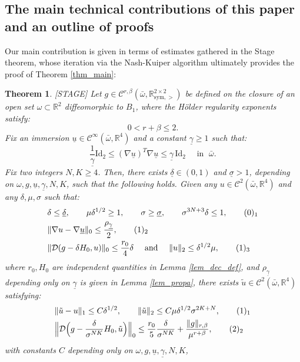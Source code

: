 \documentclass[reqno,twoside,11pt]{amsart}
\newcommand{\sym}{\mathrm{sym}}
\newcommand{\Id}{\mathrm{Id}}
\newcommand{\R}{\mathbb{R}}
\numberwithin{equation}{section}
\theoremstyle{plain}
\newtheorem{theorem}{Theorem}[section]
\theoremstyle{definition}
\begin{document}
\medskip

\subsection{The main technical contributions of this paper and an outline of proofs}
\label{stage_sketch}

Our main contribution is given in terms of estimates
gathered in the Stage theorem, whose iteration via
the Nash-Kuiper algorithm ultimately provides the proof of Theorem \ref{thm_main}: 

\begin{theorem}\label{thm_STA} {\textup{[STAGE]}}
Let $g\in \mathcal{C}^{r,\beta}(\bar\omega, \R^{2\times 2}_{\sym,>})$  be
defined on the closure of an open set $\omega\subset\R^2$
diffeomorphic to $B_1$, where the H\"older regularity exponents satisfy:
\begin{equation}\label{regu}
0<r+\beta\leq 2.
\end{equation}
Fix an immersion $\underline u\in\mathcal{C}^\infty(\bar\omega,\R^4)$
and a constant $\underline\gamma\ge 1$ such that:
\begin{equation}\label{imma}
\frac{1}{\underline\gamma}\Id_2\leq (\nabla \underline u)^T\nabla \underline u\leq
\underline\gamma\,\Id_2\quad\mbox{ in } \;\bar\omega.
\end{equation}
Fix two integers $N,K\geq 4$. Then, there exists
$\underline \delta\in (0,1)$ and $\underline\sigma>1$, depending 
on $\omega, g, \underline u,\underline \gamma, N, K$, such that the following holds.
Given any $u\in\mathcal{C}^2(\bar\omega,\R^4)$ and any $\delta, \mu, \sigma$ such that:
\begin{align*}
& \delta\leq \underline\delta,\qquad \mu\delta^{1/2}\geq 1,
\qquad\sigma\geq \underline\sigma,\qquad \sigma^{3N+3}\delta\leq 1,
\tag*{(\theequation)$_1$}\refstepcounter{equation} \label{Ass1} \\
& \|\nabla u-\nabla \underline u\|_0\leq \frac{\rho_{\underline\gamma}}{2},
\tag*{(\theequation)$_2$} \label{Ass2}\\
& \|\mathcal{D}(g-\delta H_0, u)\|_0\leq\frac{r_0}{4}\delta \quad\mbox{
and }\quad \|u\|_2\leq \delta^{1/2}\mu,
\tag*{(\theequation)$_3$} \label{Ass3}
\end{align*}
where $r_0, H_0$ are independent quantities in Lemma \ref{lem_dec_def}, 
and $\rho_{\underline\gamma}$ depending only on $\underline\gamma$ is
given in Lemma \ref{lem_propa}, there exists $\tilde u\in\mathcal{C}^2(\bar\omega,\R^4)$ satisfying:
\begin{align*}
& \|\tilde u-u\|_1\leq C\delta^{1/2},\qquad \|\tilde u\|_2\leq C\mu\delta^{1/2}\sigma^{2K+N},
\tag*{(\theequation)$_1$}\refstepcounter{equation} \label{Res1} \\
&\Big\|\mathcal{D}\Big(g-\frac{\delta}{\sigma^{NK}}H_0,\tilde u\Big)\Big\|_0\leq
  \frac{r_0}{5}\frac{\delta}{\sigma^{NK}} + \frac{\|g\|_{r,\beta}}{\mu^{r+\beta}},
\tag*{(\theequation)$_2$} \label{Res2}
\end{align*}
with constants $C$ depending only on $\omega, g, \underline u,\underline \gamma, N, K$, 
\end{theorem}
\end{document}
